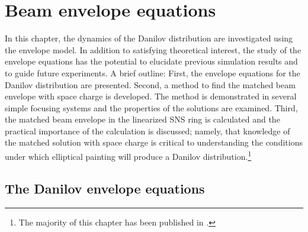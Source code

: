  \chapter{Beam envelope equations} \label{chap-2}

In this chapter, the dynamics of the Danilov distribution are investigated using the envelope model. In addition to satisfying theoretical interest, the study of the envelope equations has the potential to elucidate previous simulation results and to guide future experiments. A brief outline: First, the envelope equations for the Danilov distribution are presented. Second, a method to find the matched beam envelope with space charge is developed. The method is demonstrated in several simple focusing systems and the properties of the solutions are examined. Third, the matched beam envelope in the linearized SNS ring is calculated and the practical importance of the calculation is discussed; namely, that knowledge of the matched solution with space charge is critical to understanding the conditions under which elliptical painting will produce a Danilov distribution.\footnote{The majority of this chapter has been published in \cite{Hoover2021}.}


\section{The Danilov envelope equations}

